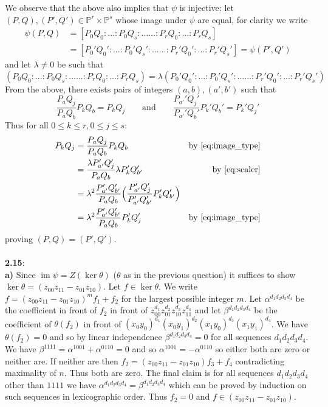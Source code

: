 \documentclass[12pt]{article}
\numberwithin{thm}{subsection}
\numberwithin{defn}{subsection}
\numberwithin{lemma}{subsection}
\numberwithin{example}{subsection}
\numberwithin{notation}{subsection}
\numberwithin{cor}{subsection}
\numberwithin{remark}{subsection}
\numberwithin{condition}{subsection}
\numberwithin{question}{subsection}
\numberwithin{construction}{subsection}
\numberwithin{construction}{subsection}
\numberwithin{construction}{subsection}
\newcommand{\bb}[1]{\mathbb{#1}}
\newcommand{\im}{\operatorname{im}}
\begin{document}
We observe that the above also implies that $\psi$ is injective: let $(P,Q),(P',Q') \in \bb{P}^r \times \bb{P}^s$ whose image under $\psi$ are equal, for clarity we write
\begin{align*}
    \psi(P,Q) &= [P_0Q_0:...:P_0Q_s:......:P_rQ_0:...:P_rQ_s]\\
    &= [P_0'Q_0':...:P_0'Q_s':......:P_r'Q_0':...:P_r'Q_s'] = \psi(P',Q')
\end{align*}
and let $\lambda \neq 0$ be such that 
\begin{equation}\label{eq:scaler}
(P_0Q_0:...:P_0Q_s:......:P_rQ_0:...:P_rQ_s) = \lambda (P_0'Q_0':...:P_0'Q_s':......:P_r'Q_0':...:P_r'Q_s')
\end{equation}
From the above, there exists pairs of integers $(a,b),(a',b')$ such that
\begin{equation}\label{eq:image_type}
    \frac{P_{a}Q_j}{P_{a}Q_b}P_kQ_b = P_kQ_j\qquad\text{and}\qquad \frac{P_{a'}'Q_j'}{P_{a'}'Q_b'}P_k'Q_b' = P_k'Q_j'
\end{equation}
Thus for all $0 \leq k \leq r, 0 \leq j \leq s$:
\begin{align*}
    P_kQ_j &= \frac{P_{a}Q_j}{P_{a}Q_b}P_kQ_b & \text{by }\eqref{eq:image_type}\\
    &= \frac{\lambda P'_{a'}Q'_j}{P_{a}Q_b}\lambda P'_kQ_{b'}' & \text{by }\eqref{eq:scaler}\\
    &= \lambda^2 \frac{P_{a'}'Q_{b'}'}{P_{a}Q_{b}} \Big(\frac{P_{a'}'Q_j'}{P_{a'}'Q_{b'}'}P_k'Q_{b'}'\Big)\\
    &= \lambda^2 \frac{P_{a'}'Q_{b'}'}{P_{a}Q_{b}} P_k'Q_j' & \text{by }\eqref{eq:image_type}
\end{align*}
proving $(P,Q) = (P',Q')$.\\\\
%
\textbf{2.15}:\\
\textbf{a)} Since $\im \psi = Z(\ker \theta)$ ($\theta$ as in the previous question) it suffices to show $\ker \theta = (z_{00}z_{11} - z_{01}z_{10})$. Let $f \in \ker \theta$. We write $f = (z_{00}z_{11} - z_{01}z_{10})^mf_1 + f_2$ for the largest possible integer $m$. Let $\alpha^{d_1d_2d_3d_4}$ be the coefficient in front of $f_2$ in front of $z_{00}^{d_1}z_{01}^{d_2}z_{10}^{d_3}z_{11}^{d_4}$ and let $\beta^{d_1d_2d_3d_4}$ be the coefficient of $\theta(f_2)$ in front of $(x_0y_0)^{d_1}(x_0y_1)^{d_2}(x_1y_0)^{d_3}(x_1y_1)^{d_4}$. We have $\theta(f_2) = 0$ and so by linear independence $\beta^{d_1d_2d_3d_4} = 0$ for all sequences $d_1d_2d_3d_4$. We have $\beta^{1111} = \alpha^{1001} + \alpha^{0110} = 0$ and so $\alpha^{1001} = -\alpha^{0110}$ so either both are zero or neither are. If neither are then $f_2 = (z_{00}z_{11} - z_{01}z_{10})f_3 + f_4$ contradicting maximality of $n$. Thus both are zero. The final claim is for all sequences $d_1d_2d_3d_4$ other than $1111$ we have $\alpha^{d_1d_2d_3d_4} = \beta^{d_1d_2d_3d_4}$ which can be proved by induction on such sequences in lexicographic order. Thus $f_2 = 0$ and $f \in (z_{00}z_{11} - z_{01}z_{10})$.\\\\
\end{document}
